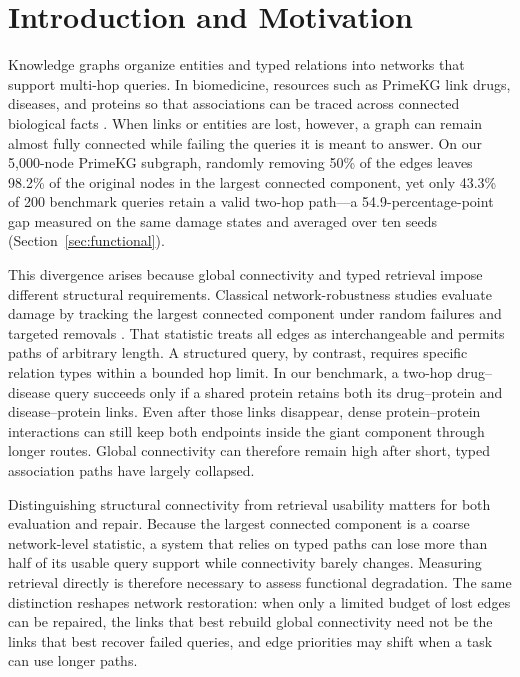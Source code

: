 \section{Introduction and Motivation}
\label{sec:introduction}

Knowledge graphs organize entities and typed relations into networks that
support multi-hop queries. In biomedicine, resources such as PrimeKG link
drugs, diseases, and proteins so that associations can be traced across
connected biological facts \cite{chandak2023primekg}. When links or entities
are lost, however, a graph can remain almost fully connected while failing
the queries it is meant to answer. On our 5,000-node PrimeKG subgraph,
randomly removing 50\% of the edges leaves 98.2\% of the original nodes in
the largest connected component, yet only 43.3\% of 200 benchmark queries
retain a valid two-hop path---a 54.9-percentage-point gap measured on the
same damage states and averaged over ten seeds (Section~\ref{sec:functional}).

This divergence arises because global connectivity and typed retrieval
impose different structural requirements. Classical network-robustness
studies evaluate damage by tracking the largest connected component under
random failures and targeted removals \cite{albert2000error,callaway2000network}.
That statistic treats all edges as interchangeable and permits paths of
arbitrary length. A structured query, by contrast, requires specific
relation types within a bounded hop limit. In our benchmark, a two-hop
drug--disease query succeeds only if a shared protein retains both its
drug--protein and disease--protein links. Even after those links disappear,
dense protein--protein interactions can still keep both endpoints inside
the giant component through longer routes. Global connectivity can
therefore remain high after short, typed association paths have largely
collapsed.

Distinguishing structural connectivity from retrieval usability matters for
both evaluation and repair. Because the largest connected component is a
coarse network-level statistic, a system that relies on typed paths can
lose more than half of its usable query support while connectivity barely
changes. Measuring retrieval directly is therefore necessary to assess
functional degradation. The same distinction reshapes network restoration:
when only a limited budget of lost edges can be repaired, the links that
best rebuild global connectivity need not be the links that best recover
failed queries, and edge priorities may shift when a task can use longer
paths.

